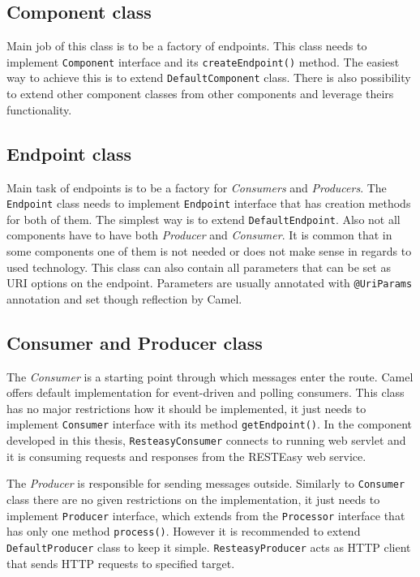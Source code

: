 \documentclass[12pt,final,oneside]{fithesis2}
\begin{document}
\subsection*{Component class}
Main job of this class is to be a factory of endpoints. This class needs to implement \texttt{Component} interface and its \texttt{createEndpoint()} method. The easiest way to achieve this is to extend \texttt{DefaultComponent} class. There is also possibility to extend other component classes from other components and leverage theirs functionality.

\subsection*{Endpoint class}
Main task of endpoints is to be a factory for \textit{Consumers} and \textit{Producers}. The \texttt{Endpoint} class needs to implement \texttt{Endpoint} interface that has creation methods for both of them. The simplest way is to extend \texttt{DefaultEndpoint}. Also not all components have to have both \textit{Producer} and \textit{Consumer}. It is common that in some components one of them is not needed or does not make sense in regards to used technology. This class can also contain all parameters that can be set as URI options on the endpoint. Parameters are usually annotated with \texttt{@UriParams} annotation and set though reflection by Camel.

\subsection*{Consumer and Producer class}
The \textit{Consumer} is a starting point through which messages enter the route. Camel offers default implementation for event-driven and polling consumers. This class has no major restrictions how it should be implemented, it just needs to implement \texttt{Consumer} interface with its method \texttt{getEndpoint()}. In the component developed in this thesis, \texttt{ResteasyConsumer} connects to running web servlet and it is consuming requests and responses from the RESTEasy web service. 

The \textit{Producer} is responsible for sending messages outside. Similarly to \texttt{Consumer} class there are no given restrictions on the implementation, it just needs to implement \texttt{Producer} interface, which extends from the \texttt{Processor} interface that has only one method \texttt{process()}. However it is recommended to extend \texttt{DefaultProducer} class to keep it simple\cite{camel-cookbook}. \texttt{ResteasyProducer} acts as HTTP client that sends HTTP requests to specified target.
\end{document}

